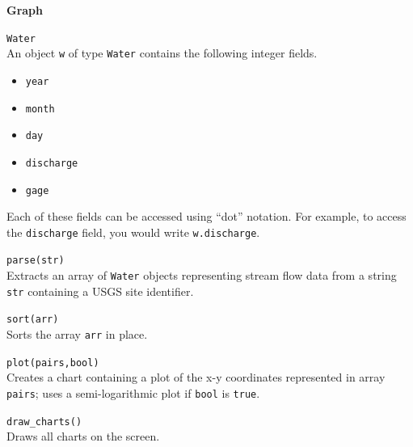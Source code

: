 \documentclass[10pt,twocolumn]{article}
\begin{document}
\noindent\textbf{\large Graph}
\begin{description}

\item{\texttt{Water}}\ \\[.25em] 
An object \texttt{w} of type \texttt{Water} contains the following integer fields. 
\begin{itemize}
\item{\texttt{year}}
\item{\texttt{month}}
\item{\texttt{day}}
\item{\texttt{discharge}}
\item{\texttt{gage}}
\end{itemize}
Each of these fields can be accessed using ``dot'' notation. For
example, to access the \texttt{discharge} field, you would write
\texttt{w.discharge}.

\item{\texttt{parse(str)}}\ \\[.25em] 
Extracts an array of \texttt{Water} objects representing stream flow
data from a string \texttt{str} containing a USGS site identifier.

\item{\texttt{sort(arr)}}\ \\[.25em] 
Sorts the array \texttt{arr} in place. 

\item{\texttt{plot(pairs,bool)}}\ \\[.25em] Creates a chart containing
  a plot of the x-y coordinates represented in array \texttt{pairs};
  uses a semi-logarithmic plot if \texttt{bool} is \texttt{true}.

\item{\texttt{draw\_charts()}}\ \\[.25em] 
Draws all charts on the screen.
\end{description}
\end{document}
